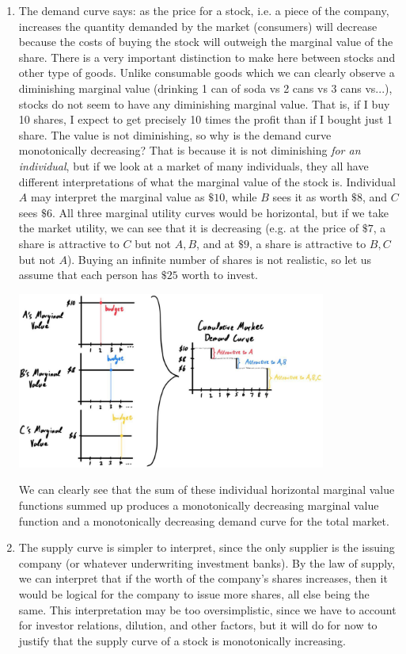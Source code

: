 \documentclass{article}
\begin{document}
    \begin{enumerate}
      \item The demand curve says: as the price for a stock, i.e. a piece of the company, increases the quantity demanded by the market (consumers) will decrease because the costs of buying the stock will outweigh the marginal value of the share. There is a very important distinction to make here between stocks and other type of goods. Unlike consumable goods which we can clearly observe a diminishing marginal value (drinking 1 can of soda vs 2 cans vs 3 cans vs...), stocks do not seem to have any diminishing marginal value. That is, if I buy 10 shares, I expect to get precisely 10 times the profit than if I bought just 1 share. The value is not diminishing, so why is the demand curve monotonically decreasing? That is because it is not diminishing \textit{for an individual}, but if we look at a market of many individuals, they all have different interpretations of what the marginal value of the stock is. Individual $A$ may interpret the marginal value as $\$10$, while $B$ sees it as worth $\$8$, and $C$ sees $\$6$. All three marginal utility curves would be horizontal, but if we take the market utility, we can see that it is decreasing (e.g. at the price of $\$7$, a share is attractive to $C$ but not $A, B$, and at $\$9$, a share is attractive to $B, C$ but not $A$). Buying an infinite number of shares is not realistic, so let us assume that each person has $\$25$ worth to invest. 
      \begin{center}
        \includegraphics[width=0.8\textwidth]{img/Stock_demand_curve.jpg}
      \end{center}
      We can clearly see that the sum of these individual horizontal marginal value functions summed up produces a monotonically decreasing marginal value function and a monotonically decreasing demand curve for the total market. 

      \item The supply curve is simpler to interpret, since the only supplier is the issuing company (or whatever underwriting investment banks). By the law of supply, we can interpret that if the worth of the company's shares increases, then it would be logical for the company to issue more shares, all else being the same. This interpretation may be too oversimplistic, since we have to account for investor relations, dilution, and other factors, but it will do for now to justify that the supply curve of a stock is monotonically increasing.  
    \end{enumerate}
\end{document}
